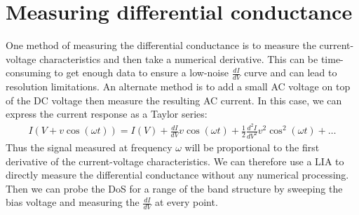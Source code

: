 \section{Measuring differential conductance}
One method of measuring the differential conductance is to measure the current-voltage characteristics and then take a numerical derivative. This can be time-consuming to get enough data to ensure a low-noise $\frac{dI}{dV}$ curve and can lead to resolution limitations. An alternate method is to add a small AC voltage on top of the DC voltage then measure the resulting AC current. In this case, we can express the current response as a Taylor series:
\begin{align}
    I(V+v\cos(\omega t)) = I(V) + \frac{dI}{dV}v\cos(\omega t) + \frac{1}{2}\frac{d^{2}I}{dV^{2}}v^{2}\cos^{2}(\omega t) + \dots
\end{align}
Thus the signal measured at frequency $\omega$ will be proportional to the first derivative of the current-voltage characteristics. We can therefore use a \ac{LIA} to directly measure the differential conductance without any numerical processing. Then we can probe the \ac{DoS} for a range of the band structure by sweeping the bias voltage and measuring the $\frac{dI}{dV}$ at every point.\par

